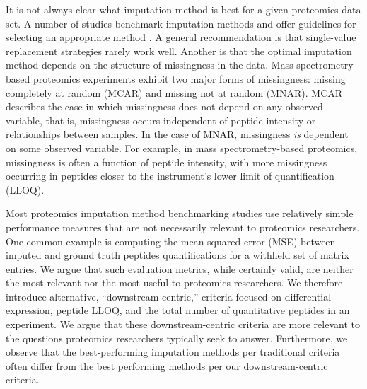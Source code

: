 \documentclass{article}
\begin{document}
It is not always clear what imputation method is best for a given proteomics data set. A number of studies benchmark imputation methods and offer guidelines for selecting an appropriate method \cite{Bramer:review, Webb-Robertson:review, DIMA, lazar, valikangas, dabke}. A general recommendation is that single-value replacement strategies rarely work well. Another is that the optimal imputation method depends on the structure of missingness in the data. Mass spectrometry-based proteomics experiments exhibit two major forms of missingness: missing completely at random (MCAR) and missing not at random (MNAR). MCAR describes the case in which missingness does not depend on any observed variable, that is, missingness occurs independent of peptide intensity or relationships between samples. In the case of MNAR, missingness \textit{is} dependent on some observed variable. For example, in mass spectrometry-based proteomics, missingness is often a function of peptide intensity, with more missingness occurring in peptides closer to the instrument's lower limit of quantification (LLOQ).

Most proteomics imputation method benchmarking studies use relatively simple performance measures that are not necessarily relevant to proteomics researchers. One common example is computing the mean squared error (MSE) between imputed and ground truth peptides quantifications for a withheld set of matrix entries. We argue that such evaluation metrics, while certainly valid, are neither the most relevant nor the most useful to proteomics researchers. We therefore introduce alternative, ``downstream-centric,'' criteria focused on differential expression, peptide LLOQ, and the total number of quantitative peptides in an experiment. We argue that these downstream-centric criteria are more relevant to the questions proteomics researchers typically seek to answer. Furthermore, we observe that the best-performing imputation methods per traditional criteria often differ from the best performing methods per our downstream-centric criteria. 
\end{document}
